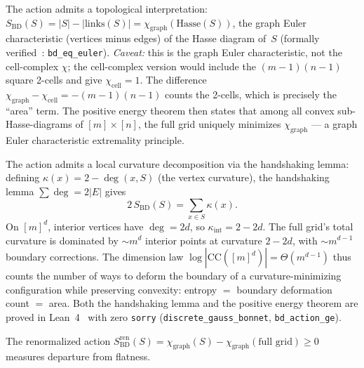 \documentclass[aps,prl,twocolumn,superscriptaddress]{revtex4-2}
\begin{document}
The action admits a topological interpretation:
$S_{\mathrm{BD}}(S) = |S| - |\mathrm{links}(S)| = \chi_{\mathrm{graph}}(\mathrm{Hasse}(S))$,
the graph Euler characteristic (vertices minus edges) of the Hasse
diagram of~$S$ (formally verified~\cite{leanrepo}: \texttt{bd\_eq\_euler}).
\emph{Caveat:} this is the graph Euler characteristic, not the
cell-complex $\chi$; the cell-complex version would include the
$(m{-}1)(n{-}1)$ square 2-cells and give $\chi_{\mathrm{cell}} = 1$.
The difference $\chi_{\mathrm{graph}} - \chi_{\mathrm{cell}} =
-(m{-}1)(n{-}1)$ counts the 2-cells, which is precisely the
``area'' term.
The positive energy theorem then states that among all convex
sub-Hasse-diagrams of $[m] \times [n]$, the full grid uniquely
minimizes $\chi_{\mathrm{graph}}$ --- a graph Euler characteristic
extremality principle.

The action admits a local curvature decomposition via the
handshaking lemma: defining $\kappa(x) = 2 - \deg(x, S)$
(the vertex curvature), the handshaking lemma
$\sum \deg = 2|E|$ gives
\begin{equation}
2\, S_{\mathrm{BD}}(S) = \sum_{x \in S} \kappa(x).
\end{equation}
On $[m]^d$, interior vertices have $\deg = 2d$, so
$\kappa_{\mathrm{int}} = 2 - 2d$.
The full grid's total curvature is dominated by $\sim m^d$
interior points at curvature $2 - 2d$, with $\sim m^{d-1}$
boundary corrections.
The dimension law $\log|\mathrm{CC}([m]^d)| = \Theta(m^{d-1})$
thus counts the number of ways to deform the boundary of a
curvature-minimizing configuration while preserving convexity:
entropy $=$ boundary deformation count $=$ area.
Both the handshaking lemma and the positive energy theorem
are proved in Lean~4~\cite{leanrepo} with zero \texttt{sorry}
(\texttt{discrete\_gauss\_bonnet}, \texttt{bd\_action\_ge}).

The renormalized action
$S_{\mathrm{BD}}^{\mathrm{ren}}(S) = \chi_{\mathrm{graph}}(S) -
\chi_{\mathrm{graph}}(\text{full grid})
\geq 0$ measures departure from flatness.
\end{document}

